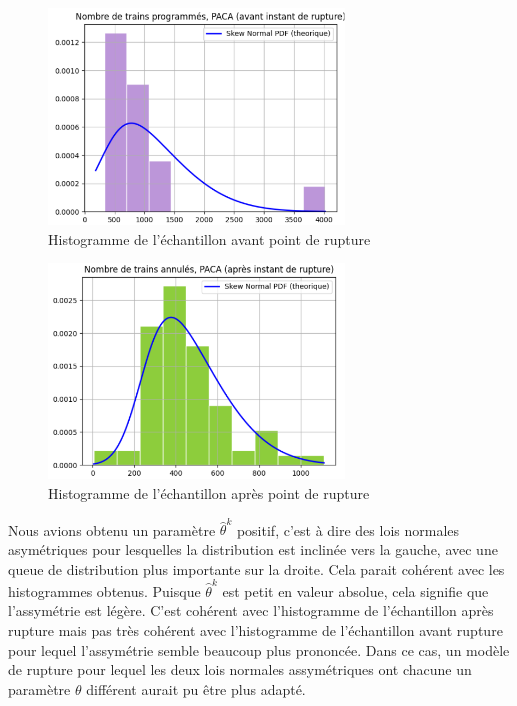 {\begin{figure}[H]
  \centering
  \includegraphics[width=0.7\textwidth]{PACA_TA_4.png}
  \caption{Histogramme de l'échantillon avant point de rupture}
\end{figure}

\begin{figure}[H]
  \centering
  \includegraphics[width=0.7\textwidth]{PACA_TA_5.png}
  \caption{Histogramme de l'échantillon après point de rupture}
\end{figure}

Nous avions obtenu un paramètre $\hat{\theta}^k$ positif, c'est à dire des lois normales asymétriques pour lesquelles la distribution est inclinée vers la gauche, avec une queue de distribution plus importante sur la droite. Cela parait cohérent avec les histogrammes obtenus. Puisque $\hat{\theta}^k$ est petit en valeur absolue, cela signifie que l'assymétrie est légère. C'est cohérent avec l'histogramme de l'échantillon après rupture mais pas très cohérent avec l'histogramme de l'échantillon avant rupture pour lequel l'assymétrie semble beaucoup plus prononcée. Dans ce cas, un modèle de rupture pour lequel les deux lois normales assymétriques ont chacune un paramètre ${\theta}$ différent aurait pu être plus adapté. \\

}
